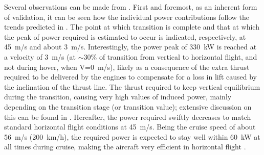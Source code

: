 Several observations can be made from . 
First and foremost, as an inherent form of validation, it can be seen how the individual power contributions follow the trends predicted in .
The point at which transition is complete and that at which the peak of power required is estimated to occur is indicated,
respectively, at \qty{45}{m/s} and about \qty{3}{m/s}.
Interestingly, the power peak of \qty{330}{kW} is reached at a velocity of \qty{3}{m/s} (at $\sim 30\%$ of transition from vertical to horizontal flight, and not during hover, when V=\qty{0}{m/s}), likely
as a consequence of the extra thrust required to be delivered by the engines to compensate for a loss in lift caused by the inclination of the thrust line.
The thrust required to keep vertical equilibrium during the transition,
causing very high values of induced power, mainly depending on the transition stage (or transition value);
extensive discussion on this can be found in .
Hereafter, the power required swiftly decreases to match standard horizontal flight conditions at \qty{45}{m/s}.
Being the cruise speed of about \qty{56}{m/s} (\qty{200}{km/h}),
the required power is expected to stay well within \qty{60}{kW} at all times during cruise,
making the aircraft very efficient in horizontal flight \cite{kadhiresan2019conceptualevtol}.
